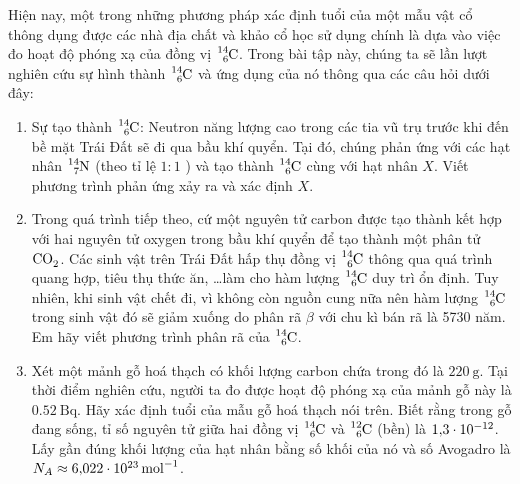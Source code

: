 \begin{ex}
	Hiện nay, một trong những phương pháp xác định tuổi của một mẫu vật cổ thông dụng được các nhà địa chất và khảo cổ học sử dụng chính là dựa vào việc đo hoạt độ phóng xạ của đồng vị $\ce{_6^{14}C}$. Trong bài tập này, chúng ta sẽ lần lượt nghiên cứu sự hình thành $\ce{_6^{14}C}$ và ứng dụng của nó thông qua các câu hỏi dưới đây:
	\begin{enumerate}[label=\alph*)]
		\item Sự tạo thành $\ce{_6^{14}C}$: Neutron năng lượng cao trong các tia vũ trụ trước khi đến bề mặt Trái Đất sẽ đi qua bầu khí quyển. Tại đó, chúng phản ứng với các hạt nhân $\ce{_7^{14}N}$ (theo tỉ lệ $1:1$ ) và tạo thành $\ce{_6^{14}C}$ cùng với hạt nhân $X$. Viết phương trình phản ứng xảy ra và xác định $X$.
		\item Trong quá trình tiếp theo, cứ một nguyên tử carbon được tạo thành kết hợp với hai nguyên tử oxygen trong bầu khí quyển để tạo thành một phân tử $\ce{CO_2}$. Các sinh vật trên Trái Đất hấp thụ đồng vị $\ce{_6^{14}C}$ thông qua quá trình quang hợp, tiêu thụ thức ăn, \dots làm cho hàm lượng $\ce{_6^{14}C}$ duy trì ổn định. Tuy nhiên, khi sinh vật chết đi, vì không còn nguồn cung nữa nên hàm lượng $\ce{_6^{14}C}$ trong sinh vật đó sẽ giảm xuống do phân rã $\beta$ với chu kì bán rã là 5730 năm.\\ 
		Em hãy viết phương trình phân rã của $\ce{_6^{14}C}$.
		\item Xét một mảnh gỗ hoá thạch có khối lượng carbon chứa trong đó là $\SI{220}{\gram}$. Tại thời điểm nghiên cứu, người ta đo được hoạt độ phóng xạ của mảnh gỗ này là $\SI{0.52}{\becquerel}$. Hãy xác định tuổi của mẫu gỗ hoá thạch nói trên. Biết rằng trong gỗ đang sống, tỉ số nguyên tử giữa hai đồng vị $\ce{_6^{14}C}$ và $\ce{_6^{12}C}$ (bền) là $\SI{1.3E-12}{}$. Lấy gần đúng khối lượng của hạt nhân bằng số khối của nó và số Avogadro là $N_{A} \approx \SI{6.022E23}{\mole^{-1}}$.
	\end{enumerate}
\end{ex}
